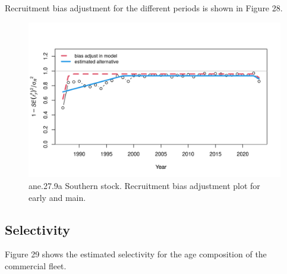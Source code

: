 \documentclass[
]{article}
\begin{document}
Recruitment bias adjustment for the different periods is shown in Figure
28.

\begin{figure}[H]

{\centering \includegraphics[width=0.95\linewidth]{report/run/S1.0_4FLEETS_SelECO_RecIndex_Mnewfix/fig_recruit_fit_bias_adjust} 

}

\caption{ane.27.9a Southern stock. Recruitment bias adjustment plot for early and main.}\label{fig:unnamed-chunk-34}
\end{figure}

\hypertarget{selectivity-1}{%
\subsection{Selectivity}\label{selectivity-1}}

Figure 29 shows the estimated selectivity for the age composition of the
commercial fleet.
\end{document}
